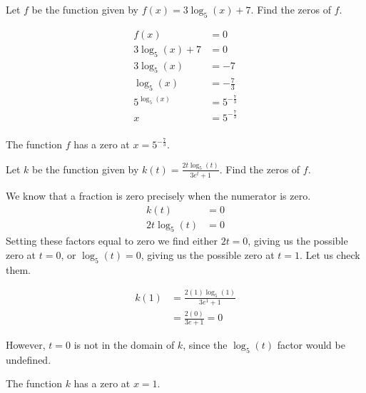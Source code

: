 \documentclass[nooutcomes]{ximera}
\begin{document}
	\begin{example}

		Let $f$ be the function given by $f(x) = 3\log_5(x)+7$. Find the zeros of $f$.
	
		\begin{explanation}

			\begin{align*}
				f(x) &= 0\\
				3\log_5(x)+7 &= 0\\
				3\log_5(x) &= -7\\
				\log_5(x) &= -\frac{7}{3}\\
				5^{\log_5(x)} &= 5^{-\frac{7}{3}}\\
				x &= 5^{-\frac{7}{3}}\\
			\end{align*}

			The function $f$ has a zero at $x=5^{-\frac{7}{3}}$.
			
		\end{explanation}
	\end{example}
	
	\begin{example}

		Let $k$ be the function given by $k(t) = \frac{2t\log_5(t)}{3e^t+1}$. Find the zeros of $f$.
	
		\begin{explanation}
			We know that a fraction is zero precisely when the numerator is zero.
			\begin{align*}
				k(t) &= 0\\
				2t\log_5(t) &= 0
			\end{align*}
			Setting these factors equal to zero we find either $2t=0$, giving us the possible zero at $t=0$, or $\log_5(t)=0$, giving us the possible zero at $t=1$. Let us check them.
			
			\begin{align*}
				k(1) &= \frac{2(1)\log_5(1)}{3e^1+1}\\
					&= \frac{2 (0) }{3e+1} = 0
			\end{align*}
			
			However, $t=0$ is not in the domain of $k$, since the $\log_5(t)$ factor would be undefined. 
			
			The function $k$ has a zero at $x=1$.
			
		\end{explanation}
	\end{example}	
	
	
\end{document}
